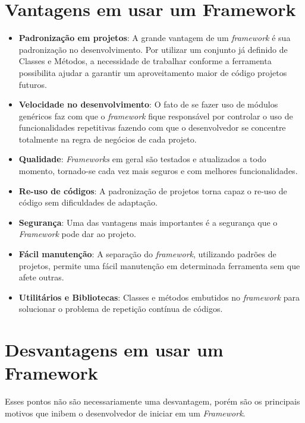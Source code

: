     \section{Vantagens em usar um Framework\label{sec:vantagens-framework}}
        \begin{itemize}
            \item \textbf{Padronização em projetos}: A grande vantagem de um \emph{framework} é sua padronização no desenvolvimento. Por utilizar um conjunto já definido de Classes e Métodos, a necessidade de trabalhar conforme a ferramenta possibilita ajudar a garantir um aproveitamento maior de código projetos futuros.

            \item \textbf{Velocidade no desenvolvimento}: O fato de se fazer uso de módulos genéricos faz com que o \emph{framework} fique responsável por controlar o uso de funcionalidades repetitivas fazendo com que o desenvolvedor se concentre totalmente na regra de negócios de cada projeto.

            \item \textbf{Qualidade}: \emph{Frameworks} em geral são testados e atualizados a todo momento, tornado-se cada vez mais seguros e com melhores funcionalidades.

            \item \textbf{Re-uso de códigos}: A padronização de projetos torna capaz o re-uso de código sem dificuldades de adaptação.

            \item \textbf{Segurança}: Uma das vantagens mais importantes é a segurança que o \emph{Framework} pode dar ao projeto.

            \item \textbf{Fácil manutenção}: A separação do \emph{framework}, utilizando padrões de projetos, permite uma fácil manutenção em determinada ferramenta sem que afete outras.

            \item \textbf{Utilitários e Bibliotecas}: Classes e métodos embutidos no \emph{framework} para solucionar o problema de repetição contínua de códigos.
        \end{itemize}

    \section{Desvantagens em usar um Framework\label{sec:desvantagens-framework}}
        Esses pontos não são necessariamente uma desvantagem, porém são os principais motivos que inibem o desenvolvedor de iniciar em um \emph{Framework}.

